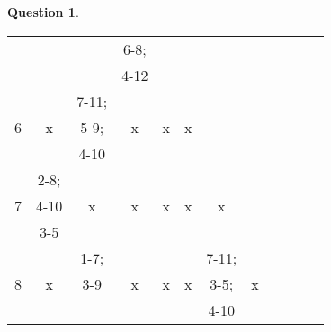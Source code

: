\documentclass[11pt,a4paper]{article}
\theoremstyle{definition}%
\newtheorem{Q}{Question}[] %
\begin{document}
\begin{Q}
{\begin{center}
\begin{tabular}{|c|c|c|c|c|c|c|c|c|c|c|c|}
				 &  &  & \cellcolor{red!25}6-8; &  & \cellcolor{gray!20} &  \cellcolor{gray!20}&  \cellcolor{gray!20}& \cellcolor{gray!20} & \cellcolor{gray!20} & \cellcolor{gray!20} & \cellcolor{gray!20}\\
				 &  &  & \cellcolor{red!25}4-12 &  & \cellcolor{gray!20} &  \cellcolor{gray!20}& \cellcolor{gray!20} & \cellcolor{gray!20} & \cellcolor{gray!20} & \cellcolor{gray!20} & \cellcolor{gray!20}\\ \hline
				\multirow{3}{*}{6} & \multirow{3}{*}{x} & \cellcolor{green!25}7-11; & \multirow{3}{*}{x} & \multirow{3}{*}{x} & \multirow{3}{*}{x} & \cellcolor{gray!20} &\cellcolor{gray!20}  & \cellcolor{gray!20} & \cellcolor{gray!20} & \cellcolor{gray!20} & \cellcolor{gray!20}\\
				 &  & \cellcolor{green!25}5-9; &  &  &  & \cellcolor{gray!20} &  \cellcolor{gray!20}&  \cellcolor{gray!20}& \cellcolor{gray!20} & \cellcolor{gray!20} & \cellcolor{gray!20}\\
				 &  & \cellcolor{green!25}4-10 &  &  &  & \cellcolor{gray!20} & \cellcolor{gray!20} &\cellcolor{gray!20}  & \cellcolor{gray!20} & \cellcolor{gray!20} &\cellcolor{gray!20}\\ \hline
				\multirow{3}{*}{7} & \cellcolor{red!25}2-8; & \multirow{3}{*}{x} & \multirow{3}{*}{x} & \multirow{3}{*}{x} & \multirow{3}{*}{x} & \multirow{3}{*}{x} & \cellcolor{gray!20} &  \cellcolor{gray!20}&  \cellcolor{gray!20}& \cellcolor{gray!20} & \cellcolor{gray!20}\\
				 & \cellcolor{red!25}4-10 &  & & &  &  & \cellcolor{gray!20} & \cellcolor{gray!20} & \cellcolor{gray!20} & \cellcolor{gray!20} & \cellcolor{gray!20}\\
				 & \cellcolor{red!25}3-5 & & & &  &  & \cellcolor{gray!20} &\cellcolor{gray!20}  & \cellcolor{gray!20} & \cellcolor{gray!20} &\cellcolor{gray!20} \\ \hline
				\multirow{3}{*}{8} & \multirow{3}{*}{x}  & \cellcolor{red!25}1-7; & \multirow{3}{*}{x}  & \multirow{3}{*}{x}  & \multirow{3}{*}{x}  & \cellcolor{red!25}7-11; & \multirow{3}{*}{x}  & \cellcolor{gray!20} &  \cellcolor{gray!20}& \cellcolor{gray!20} & \cellcolor{gray!20}\\
				& x & \cellcolor{red!25}3-9 & & & & \cellcolor{red!25}3-5; & & \cellcolor{gray!20} &\cellcolor{gray!20}  & \cellcolor{gray!20} & \cellcolor{gray!20}\\
				&  & \cellcolor{red!25} & & & & \cellcolor{red!25}4-10 & &  \cellcolor{gray!20}& \cellcolor{gray!20} &  \cellcolor{gray!20}& \cellcolor{gray!20}\\ \hline

\end{tabular}
\end{center}}
\end{Q}
\end{document}
